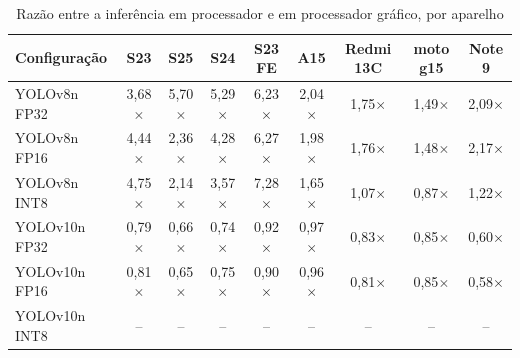 \begin{table}[H]
\centering
\footnotesize
\setlength{\tabcolsep}{4pt}
\caption{Razão entre a inferência em processador e em processador
gráfico, por aparelho}
\label{tab:ganho_gpu_dispositivos}
\begin{tabular}{lcccccccc}
\toprule
\textbf{Configuração} & \textbf{S23} & \textbf{S25} & \textbf{S24} & \textbf{S23 FE} & \textbf{A15} & \textbf{Redmi 13C} & \textbf{moto g15} & \textbf{Note 9} \\
\midrule
YOLOv8n FP32 & 3,68$\times$ & 5,70$\times$ & 5,29$\times$ & 6,23$\times$ & 2,04$\times$ & 1,75$\times$ & 1,49$\times$ & 2,09$\times$ \\
YOLOv8n FP16 & 4,44$\times$ & 2,36$\times$ & 4,28$\times$ & 6,27$\times$ & 1,98$\times$ & 1,76$\times$ & 1,48$\times$ & 2,17$\times$ \\
YOLOv8n INT8 & 4,75$\times$ & 2,14$\times$ & 3,57$\times$ & 7,28$\times$ & 1,65$\times$ & 1,07$\times$ & 0,87$\times$ & 1,22$\times$ \\
\midrule
YOLOv10n FP32 & 0,79$\times$ & 0,66$\times$ & 0,74$\times$ & 0,92$\times$ & 0,97$\times$ & 0,83$\times$ & 0,85$\times$ & 0,60$\times$ \\
YOLOv10n FP16 & 0,81$\times$ & 0,65$\times$ & 0,75$\times$ & 0,90$\times$ & 0,96$\times$ & 0,81$\times$ & 0,85$\times$ & 0,58$\times$ \\
YOLOv10n INT8 & -- & -- & -- & -- & -- & -- & -- & -- \\
\bottomrule
\end{tabular}
\end{table}
